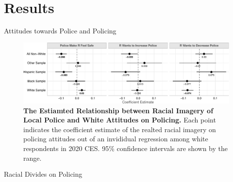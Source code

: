 \documentclass[
  10pt,
  ignorenonframetext,
]{beamer}
\begin{document}
\hypertarget{results}{%
\section{Results}\label{results}}

\begin{frame}{Attitudes towards Police and Policing}
\protect\hypertarget{attitudes-towards-police-and-policing}{}
\begin{figure}

{\centering \includegraphics{slides_files/figure-beamer/fig-baseline-1.pdf}

}

\caption{\label{fig-baseline}\textbf{The Estiamted Relationship between
Racial Imagery of Local Police and White Attitudes on Policing.} Each
point indicates the coefficient estimate of the realted racial imagery
on policing attitudes out of an invididual regression among white
respondents in 2020 CES. 95\% confidence intervals are shown by the
range.}

\end{figure}
\end{frame}

\begin{frame}{Racial Divides on Policing}
\protect\hypertarget{racial-divides-on-policing}{}
\begin{table}

\end{table}
\end{frame}
\end{document}
